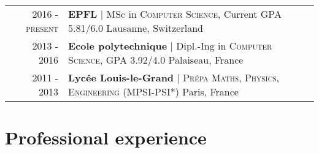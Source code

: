 \documentclass[a4paper,10pt]{article} %
\begin{document}
\begin{tabularx}{\textwidth}{rX}

2016 - \textsc{present} & \textbf{\large EPFL} \hspace{0.2cm} | \hspace{0.01cm} MSc in \textsc{Computer Science}, Current GPA 5.81/6.0 \hfill Lausanne, Switzerland\vspace{0.2cm} \\

2013 - \textsc{2016} & \textbf{\large Ecole polytechnique} \hspace{0.2cm} | \hspace{0.01cm} Dipl.-Ing in \textsc{Computer Science}, GPA 3.92/4.0 \hfill Palaiseau, France\vspace{0.2cm} \\

2011 - 2013 & \textbf{\large Lyc\'ee Louis-le-Grand} \hspace{0.2cm} | \hspace{0.01cm} \textsc{Pr\'epa Maths, Physics, Engineering} (MPSI-PSI*) \hfill Paris, France\vspace{0.2cm} \\


\end{tabularx}



\section{Professional experience}
\end{document}
